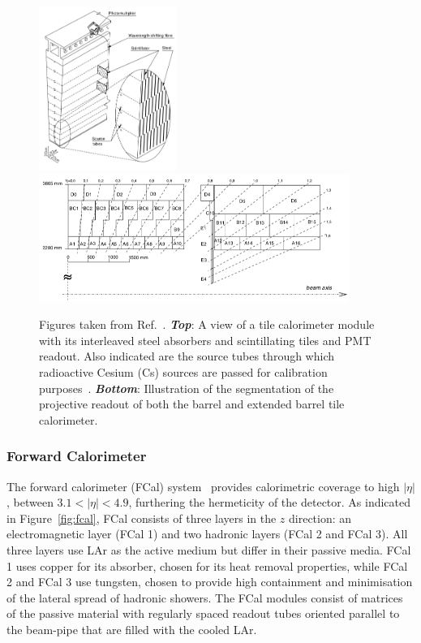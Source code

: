 \begin{figure}[!htb]
    \begin{center}
        \includegraphics[width=0.4\textwidth]{figures/chapter2/calorimeters/atlas_tile_module}
        \includegraphics[width=0.9\textwidth]{figures/chapter2/calorimeters/atlas_tile_plan_view}
        \caption{
            Figures taken from Ref.~\cite{CERN-LHCC-96-042}.
            \textbf{\textit{Top}}: A view of a tile calorimeter module with its interleaved steel
                absorbers and scintillating tiles and PMT readout. Also indicated are the source tubes
                through which radioactive Cesium (Cs) sources are passed for calibration purposes~\cite{Marjanovic:2018ohl}.
            \textbf{\textit{Bottom}}: Illustration of the segmentation of the projective readout of
                both the barrel and extended barrel tile calorimeter.
        }
        \label{fig:tile_calo}
    \end{center}
\end{figure}

\FloatBarrier
\subsubsection{Forward Calorimeter}
\label{sec:calo_forward}

The forward calorimeter (FCal) system~\cite{Artamonov_2008} provides calorimetric coverage to
high $\lvert \eta \rvert$, between $3.1 < \lvert \eta \rvert < 4.9$,
furthering the hermeticity of the detector.
As indicated in Figure~\ref{fig:fcal}, FCal consists of three layers in the
$z$ direction: an electromagnetic layer (FCal 1) and two hadronic layers (FCal 2 and FCal 3).
All three layers use LAr as the active medium but differ in their passive media.
FCal 1 uses copper for its absorber, chosen for its heat removal properties,
while FCal 2 and FCal 3 use tungsten, chosen to provide high containment and
minimisation of the lateral spread of hadronic showers.
The FCal modules consist of matrices of the passive material with regularly
spaced readout tubes  oriented parallel to the beam-pipe that are filled with the cooled LAr.

